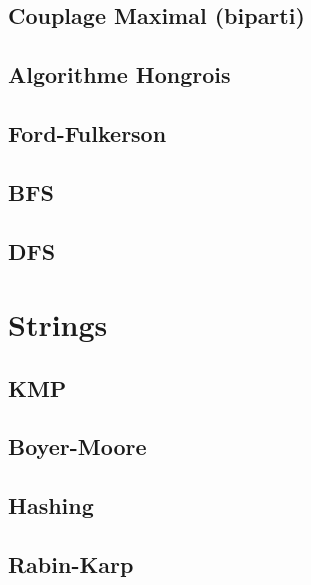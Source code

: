 \documentclass[12pt]{article}
\begin{document}
\subsection{Couplage Maximal (biparti)}
{\scriptsize}

\subsection{Algorithme Hongrois}
{\scriptsize}

\subsection{Ford-Fulkerson}
{\scriptsize}

\subsection{BFS}
{\scriptsize}

\subsection{DFS}
{\scriptsize}


\section{Strings}
\subsection{KMP}
{\scriptsize}

\subsection{Boyer-Moore}
{\scriptsize}

\subsection{Hashing}
{\scriptsize}

\subsection{Rabin-Karp}
{\scriptsize}
\end{document}
